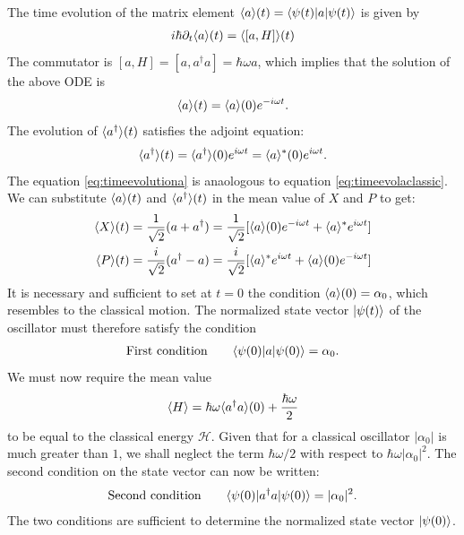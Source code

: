 The time evolution of the matrix element $\langle a\rangle(t)=\langle\psi(t)|a|\psi(t)\rangle$ is given by 
\begin{align*}
    i\hbar\partial_t\langle a\rangle(t)=\langle[a,H]\rangle(t)
\end{align*}
The commutator is $[a,H]=[a,a^\dagger a]=\hbar\omega a$, which implies that the solution of the above ODE is 
\begin{align}
    \langle a\rangle(t)=\langle a\rangle(0)e^{-i\omega t}.
    \label{eq:timeevolutiona}
\end{align}
The evolution of $\langle a^\dagger\rangle(t)$ satisfies the adjoint equation:
\begin{align*}
    \langle a^\dagger\rangle(t)=\langle a^\dagger\rangle(0)e^{i\omega t}=\langle a\rangle^*(0)e^{i\omega t}.
\end{align*}
The equation \eqref{eq:timeevolutiona} is anaologous to equation \eqref{eq:timeevolaclassic}. We can substitute $\langle a\rangle(t)$ and $\langle a^\dagger\rangle(t)$ in 
the mean value of $X$ and $P$ to get:
\begin{align}
    \langle X\rangle(t)&=\frac{1}{\sqrt{2}}(a+a^\dagger)=\frac{1}{\sqrt{2}}[\langle a\rangle(0)e^{-i\omega t}+\langle a\rangle^*e^{i\omega t}]\\
    \langle P\rangle(t)&=\frac{i}{\sqrt{2}}(a^\dagger-a)=\frac{i}{\sqrt{2}}[\langle a\rangle^*e^{i\omega t}+\langle a\rangle(0)e^{-i\omega t}]
\end{align}
It is necessary and sufficient to set at $t=0$ the condition $\langle a\rangle(0)=\alpha_0$, which resembles to the classical motion. The normalized state vector $|\psi(t)\rangle$ of the oscillator 
must therefore satisfy the condition 
\begin{align*}
    \text{First condition}\qquad\langle\psi(0)|a|\psi(0)\rangle=\alpha_0.
\end{align*}
We must now require the mean value 
\begin{align}
    \langle H\rangle=\hbar\omega\langle a^\dagger a\rangle(0)+\frac{\hbar\omega}{2}
\end{align}
to be equal to the classical energy $\mathcal{H}$. Given that for a classical oscillator $|\alpha_0|$ is much greater than $1$, we shall neglect the term $\hbar\omega/2$ with respect to 
$\hbar\omega|\alpha_0|^2$. The second condition on the state vector can now be written:
\begin{align}
    \text{Second condition}\qquad\langle\psi(0)|a^\dagger a|\psi(0)\rangle=|\alpha_0|^2.
\end{align}
The two conditions are sufficient to determine the normalized state vector $|\psi(0)\rangle$.
%
